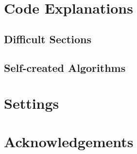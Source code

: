 \section{Code Explanations}

\subsection{Difficult Sections}

\subsection{Self-created Algorithms}

\section{Settings}

\section{Acknowledgements}


